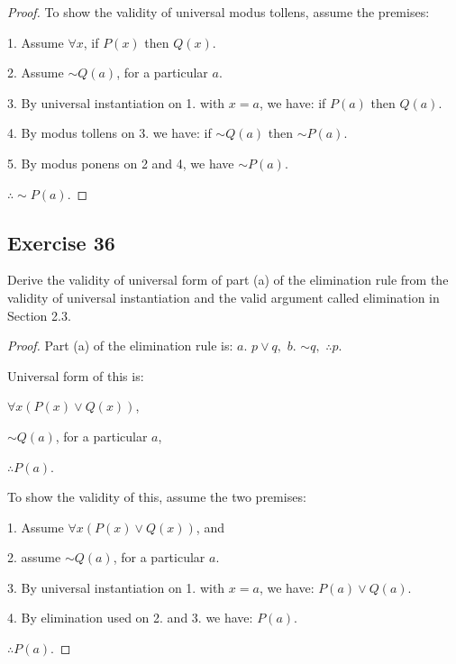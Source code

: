 \documentclass[14pt]{extarticle}
\newcommand{\fa}{\forall}
\begin{document}
\begin{proof}
    To show the validity of universal modus tollens, assume the premises:

    1. Assume $\fa x$, if $P(x)$ then $Q(x)$.

    2. Assume $\sim Q(a)$, for a particular $a$.

    3. By universal instantiation on 1. with $x = a$, we have: if $P(a)$ then $Q(a)$.

    4. By modus tollens on 3. we have: if $\sim Q(a)$ then $\sim P(a)$.

    5. By modus ponens on 2 and 4, we have $\sim P(a)$.

    $\therefore \sim P(a)$.
\end{proof}

\subsection{Exercise 36}
Derive the validity of universal form of part (a) of the elimination rule from the validity of universal instantiation and the valid argument called elimination in Section 2.3.

\begin{proof}
    Part (a) of the elimination rule is: $a. \,\, p \vee q, \,\, b.\,\, {\sim q}, \,\, \therefore p$.

    Universal form of this is:

    $\fa x (P(x) \vee Q(x))$,

    $\sim Q(a)$, for a particular $a$,

    $\therefore P(a)$.

    To show the validity of this, assume the two premises:

    1. Assume $\fa x (P(x) \vee Q(x))$, and

    2. assume $\sim Q(a)$, for a particular $a$.

    3. By universal instantiation on 1. with $x = a$, we have: $P(a) \vee Q(a)$.

    4. By elimination used on 2. and 3. we have: $P(a)$.

    $\therefore P(a)$.
\end{proof}
\end{document}
